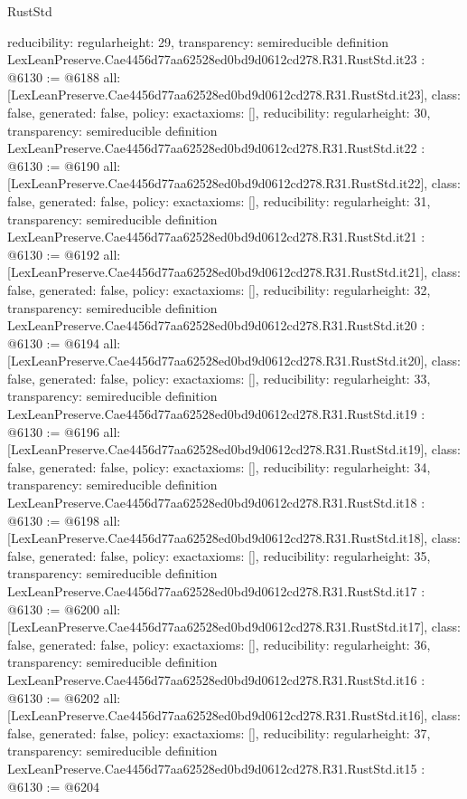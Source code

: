 \begin{lexlean}{RustStd}
\begin{coremodule}
{  reducibility: regular{height: 29},
  transparency: semireducible
}
definition LexLeanPreserve.Cae4456d77aa62528ed0bd9d0612cd278.R31.RustStd.it23 : @6130 := @6188 {
  all: [LexLeanPreserve.Cae4456d77aa62528ed0bd9d0612cd278.R31.RustStd.it23],
  class: false,
  generated: false,
  policy: exact{axioms: []},
  reducibility: regular{height: 30},
  transparency: semireducible
}
definition LexLeanPreserve.Cae4456d77aa62528ed0bd9d0612cd278.R31.RustStd.it22 : @6130 := @6190 {
  all: [LexLeanPreserve.Cae4456d77aa62528ed0bd9d0612cd278.R31.RustStd.it22],
  class: false,
  generated: false,
  policy: exact{axioms: []},
  reducibility: regular{height: 31},
  transparency: semireducible
}
definition LexLeanPreserve.Cae4456d77aa62528ed0bd9d0612cd278.R31.RustStd.it21 : @6130 := @6192 {
  all: [LexLeanPreserve.Cae4456d77aa62528ed0bd9d0612cd278.R31.RustStd.it21],
  class: false,
  generated: false,
  policy: exact{axioms: []},
  reducibility: regular{height: 32},
  transparency: semireducible
}
definition LexLeanPreserve.Cae4456d77aa62528ed0bd9d0612cd278.R31.RustStd.it20 : @6130 := @6194 {
  all: [LexLeanPreserve.Cae4456d77aa62528ed0bd9d0612cd278.R31.RustStd.it20],
  class: false,
  generated: false,
  policy: exact{axioms: []},
  reducibility: regular{height: 33},
  transparency: semireducible
}
definition LexLeanPreserve.Cae4456d77aa62528ed0bd9d0612cd278.R31.RustStd.it19 : @6130 := @6196 {
  all: [LexLeanPreserve.Cae4456d77aa62528ed0bd9d0612cd278.R31.RustStd.it19],
  class: false,
  generated: false,
  policy: exact{axioms: []},
  reducibility: regular{height: 34},
  transparency: semireducible
}
definition LexLeanPreserve.Cae4456d77aa62528ed0bd9d0612cd278.R31.RustStd.it18 : @6130 := @6198 {
  all: [LexLeanPreserve.Cae4456d77aa62528ed0bd9d0612cd278.R31.RustStd.it18],
  class: false,
  generated: false,
  policy: exact{axioms: []},
  reducibility: regular{height: 35},
  transparency: semireducible
}
definition LexLeanPreserve.Cae4456d77aa62528ed0bd9d0612cd278.R31.RustStd.it17 : @6130 := @6200 {
  all: [LexLeanPreserve.Cae4456d77aa62528ed0bd9d0612cd278.R31.RustStd.it17],
  class: false,
  generated: false,
  policy: exact{axioms: []},
  reducibility: regular{height: 36},
  transparency: semireducible
}
definition LexLeanPreserve.Cae4456d77aa62528ed0bd9d0612cd278.R31.RustStd.it16 : @6130 := @6202 {
  all: [LexLeanPreserve.Cae4456d77aa62528ed0bd9d0612cd278.R31.RustStd.it16],
  class: false,
  generated: false,
  policy: exact{axioms: []},
  reducibility: regular{height: 37},
  transparency: semireducible
}
definition LexLeanPreserve.Cae4456d77aa62528ed0bd9d0612cd278.R31.RustStd.it15 : @6130 := @6204 {
}
\end{coremodule}
\end{lexlean}
